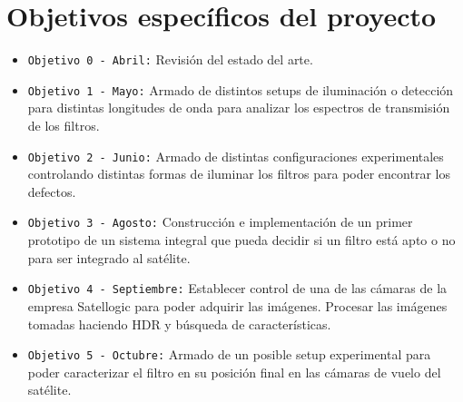 \documentclass{ctuthesis}
\begin{document}
\section*{Objetivos específicos del proyecto}
\begin{itemize}
	
	\item \texttt{Objetivo 0 - Abril:} Revisión del estado del arte.
	\item \texttt{Objetivo 1 - Mayo:} Armado de distintos setups de iluminación 
	o detección para distintas longitudes de onda para analizar los espectros 
	de transmisión de los filtros.
	\item \texttt{Objetivo 2 - Junio:} Armado de distintas configuraciones 
	experimentales controlando distintas formas de iluminar los filtros
	para poder encontrar los defectos.
	\item \texttt{Objetivo 3 - Agosto:} Construcción e implementación de un primer prototipo de un sistema integral que pueda decidir si un filtro está apto o no para ser integrado al satélite.
	\item \texttt{Objetivo 4 - Septiembre:} Establecer control de una de las cámaras de la empresa Satellogic para poder adquirir las
	imágenes. Procesar las imágenes tomadas haciendo HDR y búsqueda de características.
	\item \texttt{Objetivo 5 - Octubre:} Armado de un posible setup 
	experimental para poder caracterizar el filtro en su posición final
	en las cámaras de vuelo del satélite.
\end{itemize}
\end{document}
